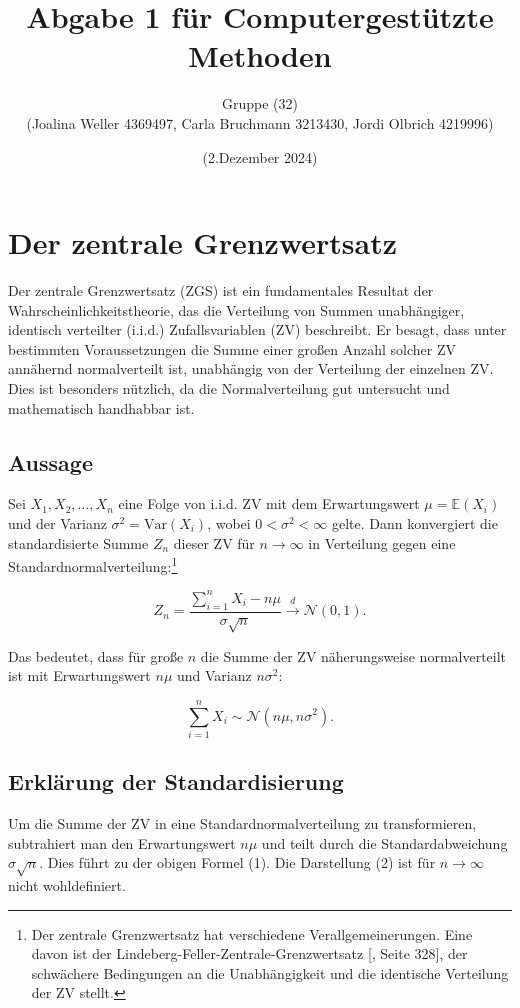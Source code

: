 \documentclass[12pt,a4paper]{article}
\title{Abgabe 1 für Computergestützte Methoden}
\author{Gruppe (32) \\ (Joalina Weller 4369497, Carla Bruchmann 3213430, Jordi Olbrich 4219996)}
\date{(2.Dezember 2024)}
\begin{document}
\maketitle

\tableofcontents

\newpage

\section{Der zentrale Grenzwertsatz}

Der zentrale Grenzwertsatz (ZGS) ist ein fundamentales Resultat der Wahrscheinlichkeitstheorie, das die Verteilung von Summen unabhängiger, identisch verteilter (i.i.d.) Zufallsvariablen (ZV) beschreibt. Er besagt, dass unter bestimmten Voraussetzungen die Summe einer großen Anzahl solcher ZV annähernd normalverteilt ist, unabhängig von der Verteilung der einzelnen ZV. Dies ist besonders nützlich, da die Normalverteilung gut untersucht und mathematisch handhabbar ist.

\subsection{Aussage}

Sei \(X_1, X_2, \dots, X_n\) eine Folge von i.i.d. ZV mit dem Erwartungswert \(\mu = \mathbb{E}(X_i)\) und der Varianz \(\sigma^2 = \text{Var}(X_i)\), wobei \(0 < \sigma^2 < \infty\) gelte. Dann konvergiert die standardisierte Summe \(Z_n\) dieser ZV für \(n \to \infty\) in Verteilung gegen eine Standardnormalverteilung:\footnote{Der zentrale Grenzwertsatz hat verschiedene Verallgemeinerungen. Eine davon ist der Lindeberg-Feller-Zentrale-Grenzwertsatz [\cite{Klenke2013}, Seite 328], der schwächere Bedingungen an die Unabhängigkeit und die identische Verteilung der ZV stellt.}

\[
Z_n = \frac{\sum_{i=1}^n X_i - n\mu}{\sigma \sqrt{n}} \overset{d}{\to} \mathcal{N}(0,1).
\]

Das bedeutet, dass für große \(n\) die Summe der ZV näherungsweise normalverteilt ist mit Erwartungswert \(n\mu\) und Varianz \(n\sigma^2\):

\[
\sum_{i=1}^n X_i \sim \mathcal{N}(n\mu, n\sigma^2).
\]

\subsection{Erklärung der Standardisierung}

Um die Summe der ZV in eine Standardnormalverteilung zu transformieren, subtrahiert man den Erwartungswert \(n\mu\) und teilt durch die Standardabweichung \(\sigma \sqrt{n}\). Dies führt zu der obigen Formel (1). Die Darstellung (2) ist für \(n \to \infty\) nicht wohldefiniert.
\end{document}
